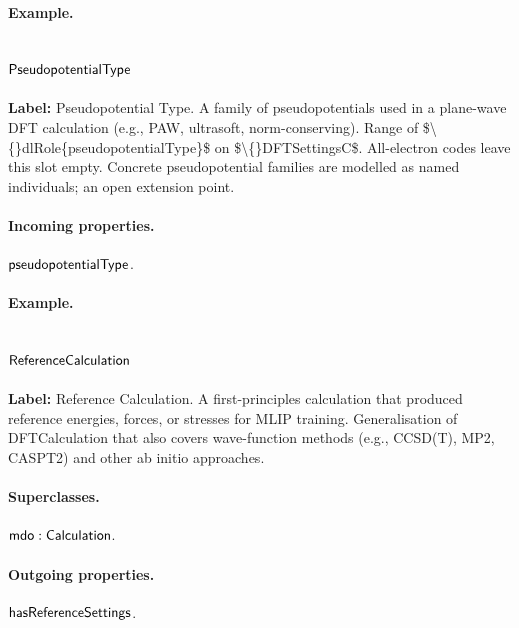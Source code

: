 \paragraph{Example.}

\subsection{$\mathsf{PseudopotentialType}$}
\label{sec:term-PseudopotentialType}

\textbf{Label:} Pseudopotential Type.
A family of pseudopotentials used in a plane-wave DFT calculation (e.g., PAW, ultrasoft, norm-conserving). Range of \$\textbackslash\{\}dlRole\{pseudopotentialType\}\$ on \$\textbackslash\{\}DFTSettingsC\$. All-electron codes leave this slot empty. Concrete pseudopotential families are modelled as named individuals; an open extension point.

\paragraph{Incoming properties.} $\mathsf{pseudopotentialType}$.

\paragraph{Example.}

\subsection{$\mathsf{ReferenceCalculation}$}
\label{sec:term-ReferenceCalculation}

\textbf{Label:} Reference Calculation.
A first-principles calculation that produced reference energies, forces, or stresses for MLIP training. Generalisation of DFTCalculation that also covers wave-function methods (e.g., CCSD(T), MP2, CASPT2) and other ab initio approaches.

\paragraph{Superclasses.} $\mathsf{mdo:Calculation}$.

\paragraph{Outgoing properties.} $\mathsf{hasReferenceSettings}$.

